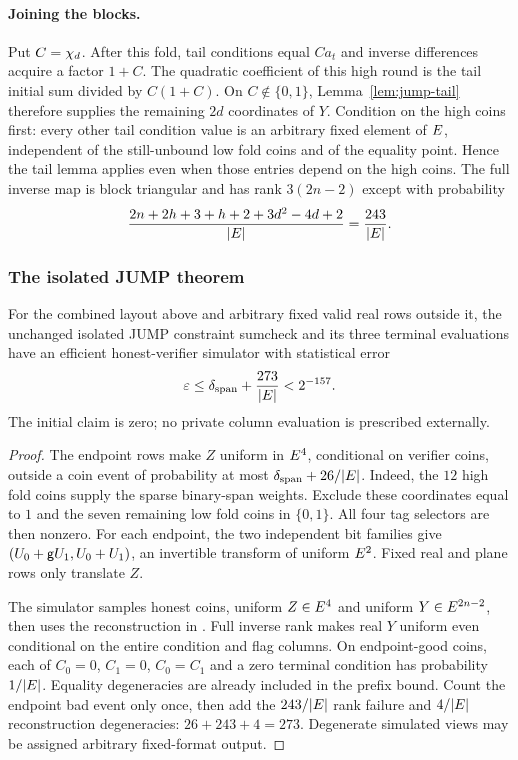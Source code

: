 \paragraph{Joining the blocks.} Put $C=\chi_d$. After this fold, tail conditions equal $C a_t$ and inverse differences acquire a factor $1+C$. The quadratic coefficient of this high round is the tail initial sum divided by $C(1+C)$. On $C\notin\{0,1\}$, Lemma~\ref{lem:jump-tail} therefore supplies the remaining $2d$ coordinates of $Y$. Condition on the high coins first: every other tail condition value is an arbitrary fixed element of $E$, independent of the still-unbound low fold coins and of the equality point. Hence the tail lemma applies even when those entries depend on the high coins. The full inverse map is block triangular and has rank $3(2n-2)$ except with probability
\[
 \frac{2n+2h+3+h+2+3d^2-4d+2}{|E|}
 =\frac{243}{|E|}.
\]

\subsubsection{The isolated JUMP theorem}

\begin{theorem}\label{thm:jump-padding}
For the combined layout above and arbitrary fixed valid real rows outside it, the unchanged isolated JUMP constraint sumcheck and its three terminal evaluations have an efficient honest-verifier simulator with statistical error
\[
 \varepsilon\le\delta_{\mathrm{span}}+\frac{273}{|E|}<2^{-157}.
\]
The initial claim is zero; no private column evaluation is prescribed externally.
\end{theorem}
\begin{proof}
The endpoint rows make $Z$ uniform in $E^4$, conditional on verifier coins, outside a coin event of probability at most $\delta_{\mathrm{span}}+26/|E|$. Indeed, the $12$ high fold coins supply the sparse binary-span weights. Exclude these coordinates equal to $1$ and the seven remaining low fold coins in $\{0,1\}$. All four tag selectors are then nonzero. For each endpoint, the two independent bit families give $(U_0+\mathsf{g} U_1,U_0+U_1)$, an invertible transform of uniform $E^2$. Fixed real and plane rows only translate $Z$.

The simulator samples honest coins, uniform $Z\in E^4$ and uniform $Y\in E^{2n-2}$, then uses the reconstruction in . Full inverse rank makes real $Y$ uniform even conditional on the entire condition and flag columns. On endpoint-good coins, each of $C_0=0$, $C_1=0$, $C_0=C_1$ and a zero terminal condition has probability $1/|E|$. Equality degeneracies are already included in the prefix bound. Count the endpoint bad event only once, then add the $243/|E|$ rank failure and $4/|E|$ reconstruction degeneracies: $26+243+4=273$. Degenerate simulated views may be assigned arbitrary fixed-format output.
\end{proof}

